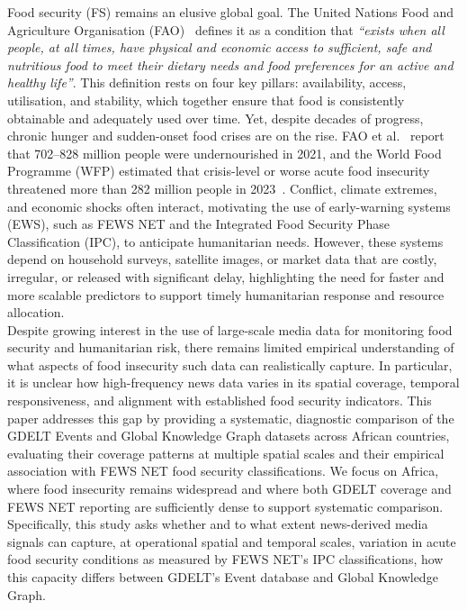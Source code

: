 \documentclass{article}
\begin{document}
Food security (FS) remains an elusive global goal. The United Nations Food and Agriculture Organisation (FAO)~\citep{FAO1996} defines it as a condition that \textit{``exists when all people, at all times, have physical and economic access to sufficient, safe and nutritious food to meet their dietary needs and food preferences for an active and healthy life''}. This definition rests on four key pillars: availability, access, utilisation, and stability, which together ensure that food is consistently obtainable and adequately used over time. Yet, despite decades of progress, chronic hunger and sudden-onset food crises are on the rise. FAO et al.~\citep{FAO2023} report that 702–828 million people were undernourished in 2021, and the World Food Programme (WFP) estimated that crisis-level or worse acute food insecurity threatened more than 282 million people in 2023~\citep{WFPhm2024}. Conflict, climate extremes, and economic shocks often interact, motivating the use of early-warning systems (EWS), such as FEWS NET and the Integrated Food Security Phase Classification (IPC), to anticipate humanitarian needs. However, these systems depend on household surveys, satellite images, or market data that are costly, irregular, or released with significant delay, highlighting the need for faster and more scalable predictors to support timely humanitarian response and resource allocation.\\

Despite growing interest in the use of large-scale media data for monitoring food security and humanitarian risk, there remains limited empirical understanding of what aspects of food insecurity such data can realistically capture. In particular, it is unclear how high-frequency news data varies in its spatial coverage, temporal responsiveness, and alignment with established food security indicators. This paper addresses this gap by providing a systematic, diagnostic comparison of the GDELT Events and Global Knowledge Graph datasets across African countries, evaluating their coverage patterns at multiple spatial scales and their empirical association with FEWS NET food security classifications. We focus on Africa, where food insecurity remains widespread and where both GDELT coverage and FEWS NET reporting are sufficiently dense to support systematic comparison. Specifically, this study asks whether and to what extent news-derived media signals can capture, at operational spatial and temporal scales, variation in acute food security conditions as measured by FEWS NET’s IPC classifications, how this capacity differs between GDELT's Event database and Global Knowledge Graph.
\end{document}

